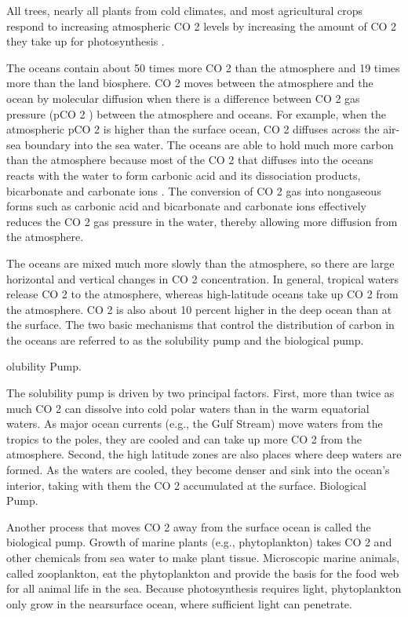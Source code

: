 \documentclass[
]{book}
\begin{document}
All trees, nearly all plants from cold climates, and most agricultural crops respond to increasing atmospheric CO 2 levels by increasing the amount of CO 2 they take up for photosynthesis .

The oceans contain about 50 times more CO 2 than the atmosphere and 19 times more than the land biosphere. CO 2 moves between the atmosphere and the ocean by molecular diffusion when there is a difference between CO 2 gas pressure (pCO 2 ) between the atmosphere and oceans. For example, when the atmospheric pCO 2 is higher than the surface ocean, CO 2 diffuses across the air-sea boundary into the sea water.
The oceans are able to hold much more carbon than the atmosphere because most of the CO 2 that diffuses into the oceans reacts with the water to form carbonic acid and its dissociation products, bicarbonate and carbonate ions . The conversion of CO 2 gas into nongaseous forms such as carbonic acid and bicarbonate and carbonate ions effectively reduces the CO 2 gas pressure in the water, thereby allowing more diffusion from the atmosphere.

The oceans are mixed much more slowly than the atmosphere, so there are large horizontal and vertical changes in CO 2 concentration. In general, tropical waters release CO 2 to the atmosphere, whereas high-latitude oceans take up CO 2 from the atmosphere. CO 2 is also about 10 percent higher in the deep ocean than at the surface. The two basic mechanisms that control the distribution of carbon in the oceans are referred to as the solubility pump and the biological pump.

olubility Pump.

The solubility pump is driven by two principal factors. First, more than twice as much CO 2 can dissolve into cold polar waters than in the warm equatorial waters. As major ocean currents (e.g., the Gulf Stream) move waters from the tropics to the poles, they are cooled and can take up more CO 2 from the atmosphere. Second, the high latitude zones are also places where deep waters are formed. As the waters are cooled, they become denser and sink into the ocean's interior, taking with them the CO 2 accumulated at the surface.
Biological Pump.

Another process that moves CO 2 away from the surface ocean is called the biological pump. Growth of marine plants (e.g., phytoplankton) takes CO 2 and other chemicals from sea water to make plant tissue. Microscopic marine animals, called zooplankton, eat the phytoplankton and provide the basis for the food web for all animal life in the sea. Because photosynthesis requires light, phytoplankton only grow in the nearsurface ocean, where sufficient light can penetrate.
\end{document}
